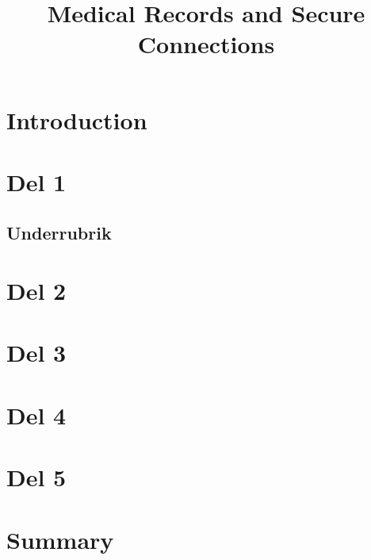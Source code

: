 \documentclass[conference]{IEEEtran}
\begin{document}
\title{Medical Records and Secure Connections}


\author{
}


\maketitle


\begin{abstract}

\end{abstract}

\section{Introduction}

\section{Del 1}

\subsection{Underrubrik}


\section{Del 2}


\section{Del 3}


\section{Del 4}


\section{Del 5}

\section{Summary}
\end{document}
